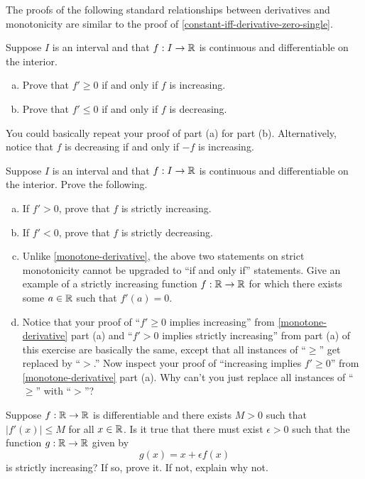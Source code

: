 The proofs of the following standard relationships between derivatives and monotonicity are similar to the proof of \cref{constant-iff-derivative-zero-single}.

\begin{exercise} \label{monotone-derivative}
	Suppose $I$ is an interval and that $f : I \to \mathbb{R}$ is continuous and differentiable on the interior. 
	\begin{enumerate}[(a)]
		\item Prove that $f' \geq 0$ if and only if $f$ is increasing. 
		\item Prove that $f' \leq 0$ if and only if $f$ is decreasing.
	\end{enumerate}
	\begin{hint}
		You could basically repeat your proof of part (a) for part (b). Alternatively, notice that $f$ is decreasing if and only if $-f$ is increasing. 
	\end{hint}
\end{exercise}

\begin{exercise} \label{strictly-monotone-derivative}
	Suppose $I$ is an interval and that $f : I \to \mathbb{R}$ is continuous and differentiable on the interior. Prove the following. 
	\begin{enumerate}[(a)]
		\item If $f' > 0$, prove that $f$ is strictly increasing. 
		\item If $f' < 0$, prove that $f$ is strictly decreasing. 
		\item Unlike \cref{monotone-derivative}, the above two statements on strict monotonicity cannot be upgraded to ``if and only if'' statements. Give an example of a strictly increasing function $f : \mathbb{R} \to \mathbb{R}$ for which there exists some $a \in \mathbb{R}$ such that $f'(a) = 0$. 
		\item Notice that your proof of ``$f' \geq 0$ implies increasing'' from \cref{monotone-derivative} part (a) and ``$f' > 0$ implies strictly increasing'' from part (a) of this exercise are basically the same, except that all instances of ``$\geq$'' get replaced by ``$>$.'' Now inspect your proof of ``increasing implies $f' \geq 0$'' from \cref{monotone-derivative} part (a). Why can't you just replace all instances of ``$\geq$'' with ``$>$''?
	\end{enumerate} 
\end{exercise}

\begin{exercise}
	Suppose $f : \mathbb{R} \to \mathbb{R}$ is differentiable and there exists $M > 0$ such that $|f'(x)| \leq M$ for all $x \in \mathbb{R}$. Is it true that there must exist $\epsilon >  0$ such that the function $g : \mathbb{R} \to \mathbb{R}$ given by \[ g(x) = x + \epsilon f(x) \]
	is strictly increasing? If so, prove it. If not, explain why not. 
\end{exercise}

